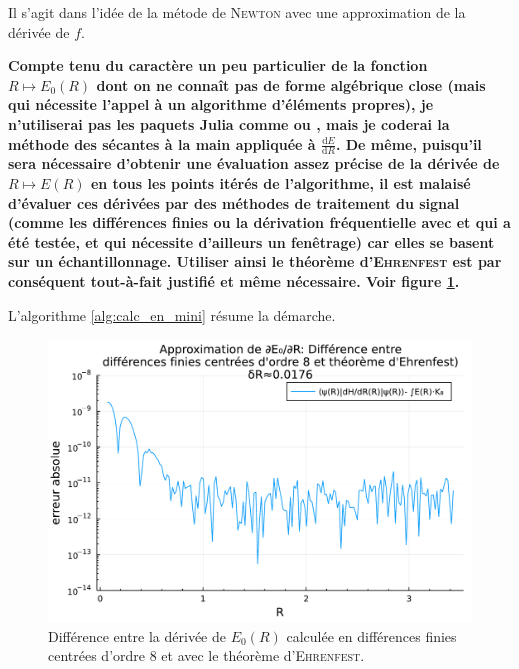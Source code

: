 \documentclass[svgnames,dvipsnames,a4paper,10pt,french]{report}
\begin{document}
Il s'agit dans l'idée de la métode de \textsc{Newton} avec une approximation de la dérivée de $f$.

\textbf{Compte tenu du caractère un peu particulier de la fonction $R \mapsto E_0(R)$ dont on ne connaît pas de forme algébrique close (mais qui nécessite l'appel à un algorithme d'éléments propres), je n'utiliserai pas les paquets Julia comme  ou , mais je coderai la méthode des sécantes à la main appliquée à $\frac{\mathrm{d}E}{\mathrm{d}R}$. De même, puisqu'il sera nécessaire d'obtenir une évaluation assez précise de la dérivée de $R\mapsto E(R)$ en tous les points itérés de l'algorithme, il est malaisé d'évaluer ces dérivées par des méthodes de traitement du signal (comme les différences finies ou la dérivation fréquentielle avec  et  qui a été testée, et qui nécessite d'ailleurs un fenêtrage) car elles se basent sur un échantillonnage. Utiliser ainsi le théorème d'\textsc{Ehrenfest} est par conséquent tout-à-fait justifié et même nécessaire. Voir figure \ref{fig:ehrenfest_erreur}.} 

L'algorithme \ref{alg:calc_en_mini} résume la démarche.

\begin{figure}
    \centering
    \includegraphics[width=.7\textwidth]{images/erreur_dérivée.pdf}
    \caption[Différence entre la dérivée de $E_0(R)$ calculée en différences finies centrées d'ordre 8 et avec le théorème d'\textsc{Ehrenfest}.]{Différence entre la dérivée de $E_0(R)$ calculée en différences finies centrées d'ordre 8 et avec le théorème d'\textsc{Ehrenfest}.}
    \label{fig:ehrenfest_erreur}
\end{figure}
\end{document}
